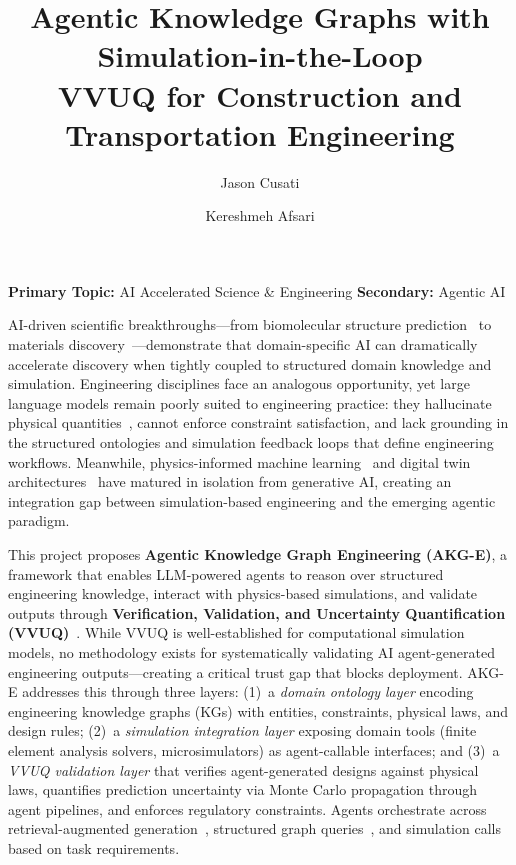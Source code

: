 \documentclass[conference, 10pt]{IEEEtran}
\title{Agentic Knowledge Graphs with Simulation-in-the-Loop\\VVUQ for Construction and Transportation Engineering}
\author{Jason Cusati \and Kereshmeh Afsari}
\date{}
\begin{document}
\maketitle
\thispagestyle{empty}

\vspace{-1.5em}

\noindent\textbf{Primary Topic:} AI Accelerated Science \& Engineering \hfill
\textbf{Secondary:} Agentic AI

\vspace{0.5em}

AI-driven scientific breakthroughs---from biomolecular structure prediction~\cite{Abramson2024AlphaFold3} to materials discovery~\cite{Merchant2023GNoME}---demonstrate that domain-specific AI can dramatically accelerate discovery when tightly coupled to structured domain knowledge and simulation. Engineering disciplines face an analogous opportunity, yet large language models remain poorly suited to engineering practice: they hallucinate physical quantities~\cite{Ji2023HallucinationSurvey}, cannot enforce constraint satisfaction, and lack grounding in the structured ontologies and simulation feedback loops that define engineering workflows. Meanwhile, physics-informed machine learning~\cite{Karniadakis2021PINN} and digital twin architectures~\cite{Tao2019DigitalTwin} have matured in isolation from generative AI, creating an integration gap between simulation-based engineering and the emerging agentic paradigm.

This project proposes \textbf{Agentic Knowledge Graph Engineering (AKG-E)}, a framework that enables LLM-powered agents to reason over structured engineering knowledge, interact with physics-based simulations, and validate outputs through \textbf{Verification, Validation, and Uncertainty Quantification (VVUQ)}~\cite{Oberkampf2010VVUQ}. While VVUQ is well-established for computational simulation models, no methodology exists for systematically validating AI agent-generated engineering outputs---creating a critical trust gap that blocks deployment. AKG-E addresses this through three layers: (1)~a \textit{domain ontology layer} encoding engineering knowledge graphs (KGs) with entities, constraints, physical laws, and design rules; (2)~a \textit{simulation integration layer} exposing domain tools (finite element analysis solvers, microsimulators) as agent-callable interfaces; and (3)~a \textit{VVUQ validation layer} that verifies agent-generated designs against physical laws, quantifies prediction uncertainty via Monte Carlo propagation through agent pipelines, and enforces regulatory constraints. Agents orchestrate across retrieval-augmented generation~\cite{Lewis2020RAG}, structured graph queries~\cite{Edge2024GraphRAG}, and simulation calls based on task requirements.
\end{document}
